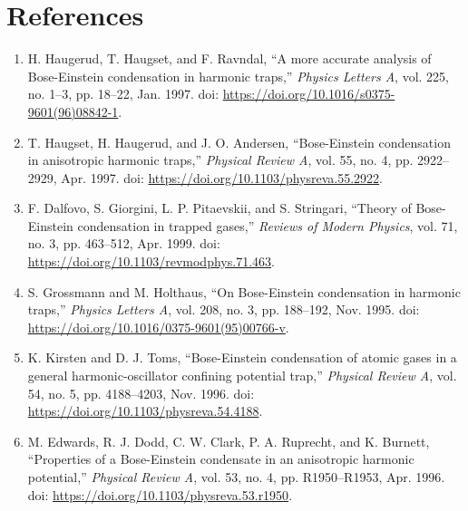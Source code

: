 \documentclass{article}
\numberwithin{equation}{section}
\numberwithin{equation}{subsection}
\begin{document}
\section{References}
\begin{enumerate}
    \item H. Haugerud, T. Haugset, and F. Ravndal, “A more accurate analysis of Bose-Einstein condensation in harmonic traps,” \textit{Physics Letters A}, vol. 225, no. 1–3, pp. 18–22, Jan. 1997. doi: \url{https://doi.org/10.1016/s0375-9601(96)08842-1}.
    \item T. Haugset, H. Haugerud, and J. O. Andersen, “Bose-Einstein condensation in anisotropic harmonic traps,” \textit{Physical Review A}, vol. 55, no. 4, pp. 2922–2929, Apr. 1997. doi: \url{https://doi.org/10.1103/physreva.55.2922}.
    \item F. Dalfovo, S. Giorgini, L. P. Pitaevskii, and S. Stringari, “Theory of Bose-Einstein condensation in trapped gases,” \textit{Reviews of Modern Physics}, vol. 71, no. 3, pp. 463–512, Apr. 1999. doi: \url{https://doi.org/10.1103/revmodphys.71.463}.
    \item S. Grossmann and M. Holthaus, “On Bose-Einstein condensation in harmonic traps,” \textit{Physics Letters A}, vol. 208, no. 3, pp. 188–192, Nov. 1995. doi: \url{https://doi.org/10.1016/0375-9601(95)00766-v}.
    \item K. Kirsten and D. J. Toms, “Bose-Einstein condensation of atomic gases in a general harmonic-oscillator confining potential trap,” \textit{Physical Review A}, vol. 54, no. 5, pp. 4188–4203, Nov. 1996. doi: \url{https://doi.org/10.1103/physreva.54.4188}.
    \item M. Edwards, R. J. Dodd, C. W. Clark, P. A. Ruprecht, and K. Burnett, “Properties of a Bose-Einstein condensate in an anisotropic harmonic potential,” \textit{Physical Review A}, vol. 53, no. 4, pp. R1950–R1953, Apr. 1996. doi: \url{https://doi.org/10.1103/physreva.53.r1950}.
\end{enumerate}
\end{document}
